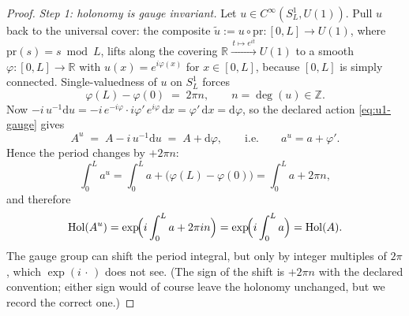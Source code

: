 \documentclass[11pt,a4paper]{article}
\theoremstyle{plain}
\theoremstyle{definition}
\theoremstyle{remark}
\newcommand{\Real}{\mathbb{R}}
\newcommand{\Int}{\mathbb{Z}}
\newcommand{\Hol}{\operatorname{Hol}}
\begin{document}
\begin{proof}
\emph{Step 1: holonomy is gauge invariant.}
Let $u\in C^\infty(S^1_L,U(1))$. Pull $u$ back to the universal cover: the composite
$\tilde u:=u\circ\mathrm{pr}\colon[0,L]\to U(1)$, where $\mathrm{pr}(s)=s\bmod L$, lifts along the
covering $\Real\xrightarrow{\,t\mapsto e^{it}\,}U(1)$ to a smooth
$\varphi\colon[0,L]\to\Real$ with $u(x)=e^{i\varphi(x)}$ for $x\in[0,L]$, because $[0,L]$ is simply
connected. Single-valuedness of $u$ on $S^1_L$ forces
\begin{equation}
\label{eq:winding}
\varphi(L)-\varphi(0)\;=\;2\pi n,
\qquad n=\deg(u)\in\Int .
\end{equation}
Now $-i\,u^{-1}\mathrm{d}u = -i\,e^{-i\varphi}\cdot i\varphi'\,e^{i\varphi}\,\mathrm{d}x
=\varphi'\,\mathrm{d}x=\mathrm{d}\varphi$, so the declared action \eqref{eq:u1-gauge} gives
\begin{equation}
\label{eq:Au-explicit}
A^{u}\;=\;A-i\,u^{-1}\mathrm{d}u\;=\;A+\mathrm{d}\varphi,
\qquad\text{i.e.}\qquad
a^{u}=a+\varphi' .
\end{equation}
Hence the period changes by $+2\pi n$:
\[
\int_0^L a^{u}
=\int_0^L a+\bigl(\varphi(L)-\varphi(0)\bigr)
=\int_0^L a+2\pi n ,
\]
and therefore
\[
\Hol(A^{u})
=\exp\!\Bigl(i\int_0^L a + 2\pi i n\Bigr)
=\exp\!\Bigl(i\int_0^L a\Bigr)
=\Hol(A) .
\]
The gauge group can shift the period integral, but only by integer multiples of $2\pi$, which
$\exp(i\,\cdot\,)$ does not see. (The sign of the shift is $+2\pi n$ with the declared convention;
either sign would of course leave the holonomy unchanged, but we record the correct one.)


\end{proof}
\end{document}
